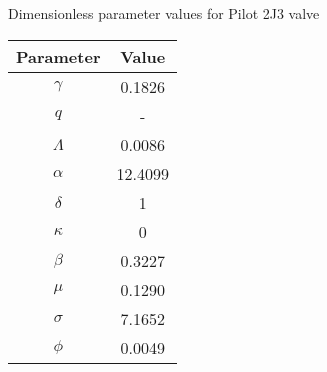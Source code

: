 
% 








\newpage
Dimensionless parameter values for Pilot 2J3 valve

\begin{tabular}{c|c}
    Parameter & Value \\ \hline
    $\gamma$ & 0.1826 \\
    $q$ & - \\
    $\Lambda$ & 0.0086 \\
    $\alpha$ & 12.4099 \\
    $\delta$ & 1 \\
    $\kappa$ & 0 \\
    $\beta$ & 0.3227 \\
    $\mu$ & 0.1290 \\
    $\sigma$ & 7.1652 \\
    $\phi$ & 0.0049 \\
\end{tabular}